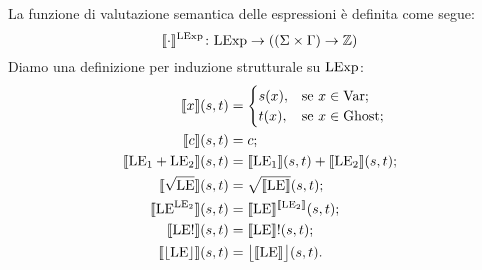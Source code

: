 \begin{definizione} 
La funzione di valutazione semantica delle espressioni è definita come segue:
\[
   \mathord{\llbracket \cdot \rrbracket ^{\mathrm{LExp}}}\colon\mathrm{LExp}\to((\Sigma \times \Gamma) \rightarrow \mathbb{Z})
\]
Diamo una definizione per induzione strutturale su $\mathrm{LExp}$:
\begin{align*}
   \llbracket x \rrbracket(s,t)
      &=
        \begin{cases}
                 s(x), &\text{se $x \in \mathrm{Var}$};\\
                 t(x), &\text{se $x \in \mathrm{Ghost}$};
        \end{cases}\\
   \llbracket  c \rrbracket(s,t)
     &=  c;\\
   \llbracket \mathrm{LE}_1 + \mathrm{LE}_2 \rrbracket(s,t)
     &= \llbracket \mathrm{LE}_1 \rrbracket(s,t) + \llbracket \mathrm{LE}_2 \rrbracket(s,t);\\
   \llbracket \sqrt{\mathrm{LE}} \rrbracket(s,t)
     &= \sqrt{\llbracket \mathrm{LE} \rrbracket}(s,t);\\
   \llbracket \mathrm{LE}^{\mathrm{LE}_2} \rrbracket(s,t)
     &= \llbracket \mathrm{LE} \rrbracket^{\llbracket \mathrm{LE}_2 \rrbracket}(s,t);\\
   \llbracket \mathrm{LE}! \rrbracket(s,t)
     &= \llbracket \mathrm{LE} \rrbracket!(s,t);\\
   \llbracket \lfloor \mathrm{LE} \rfloor \rrbracket(s,t)
     &= \bigl \lfloor \llbracket \mathrm{LE} \rrbracket \bigr \rfloor(s,t).
\end{align*}
\end{definizione}

